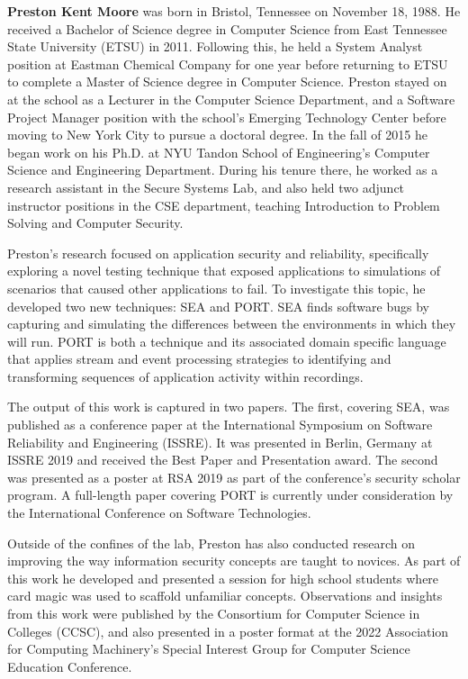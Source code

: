 

\textbf{Preston Kent Moore} was born in Bristol, Tennessee on November 18, 1988.  He received a Bachelor of Science degree in Computer Science from East Tennessee State University (ETSU) in 2011.
Following this, he held a System Analyst position at Eastman Chemical Company for one year
before returning to ETSU to complete a Master of Science degree in Computer Science.
Preston stayed on at the school as a Lecturer in the Computer Science Department, and a Software Project Manager position with the school's Emerging Technology Center before moving to New York City to pursue a doctoral degree.
In the fall of 2015 he began work on his Ph.D. at NYU Tandon School of Engineering's Computer Science and Engineering Department. During his tenure there, he worked as a research assistant in the Secure Systems Lab, and also held two adjunct instructor positions in the CSE department, teaching Introduction to Problem Solving and Computer Security.

Preston's research focused on application security and reliability, specifically
exploring a novel testing technique that exposed applications to simulations of scenarios that caused other applications to fail.
To investigate this topic, he developed two new techniques: SEA and PORT.
SEA finds software bugs by capturing and simulating the differences between the environments in which they will run.
PORT is both a technique and its associated domain specific language that applies stream and event processing strategies to identifying and transforming  sequences of application activity within recordings.

The output of  this work is captured in two papers. The first, covering SEA, was published as a conference paper at the International Symposium on Software Reliability and Engineering (ISSRE).
It was presented in Berlin, Germany at ISSRE 2019 and received the Best Paper and Presentation award.
The second was presented as a poster at RSA 2019 as part of the conference's security scholar program.
A full-length paper covering PORT is currently under consideration by the International Conference on Software Technologies.

Outside of the confines of the lab, Preston has also conducted research on improving the way information security concepts are taught to novices.
As part of this work he developed and presented a session for high school students where card magic was used to scaffold unfamiliar concepts.
Observations and insights from this work were published by the Consortium for Computer Science in Colleges (CCSC), and also presented in a poster format at the 2022 Association for Computing Machinery's Special Interest Group for Computer Science Education Conference.


